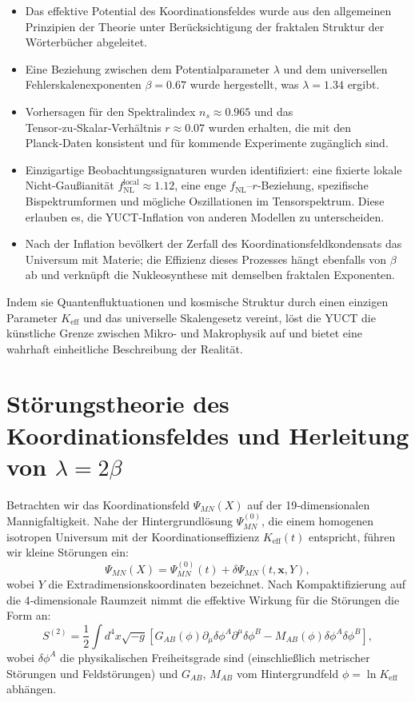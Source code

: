 \documentclass[11pt,a4paper]{article}
\newcommand{\Keff}{K_{\mathrm{eff}}}
\begin{document}
	\begin{itemize}
		\item Das effektive Potential des Koordinationsfeldes wurde aus den allgemeinen Prinzipien der Theorie unter Berücksichtigung der fraktalen Struktur der Wörterbücher abgeleitet.
		\item Eine Beziehung zwischen dem Potentialparameter \(\lambda\) und dem universellen Fehlerskalenexponenten \(\beta = 0.67\) wurde hergestellt, was \(\lambda = 1.34\) ergibt.
		\item Vorhersagen für den Spektralindex \(n_s \approx 0.965\) und das Tensor‑zu‑Skalar‑Verhältnis \(r \approx 0.07\) wurden erhalten, die mit den Planck‑Daten konsistent und für kommende Experimente zugänglich sind.
		\item Einzigartige Beobachtungssignaturen wurden identifiziert: eine fixierte lokale Nicht‑Gaußianität \(f_{\text{NL}}^{\text{local}} \approx 1.12\), eine enge \(f_{\text{NL}}\)–\(r\)‑Beziehung, spezifische Bispektrumformen und mögliche Oszillationen im Tensorspektrum. Diese erlauben es, die YUCT‑Inflation von anderen Modellen zu unterscheiden.
		\item Nach der Inflation bevölkert der Zerfall des Koordinationsfeldkondensats das Universum mit Materie; die Effizienz dieses Prozesses hängt ebenfalls von \(\beta\) ab und verknüpft die Nukleosynthese mit demselben fraktalen Exponenten.
	\end{itemize}
	
	Indem sie Quantenfluktuationen und kosmische Struktur durch einen einzigen Parameter \(K_{\mathrm{eff}}\) und das universelle Skalengesetz vereint, löst die YUCT die künstliche Grenze zwischen Mikro- und Makrophysik auf und bietet eine wahrhaft einheitliche Beschreibung der Realität.
	
	\appendix
	\section{Störungstheorie des Koordinationsfeldes und Herleitung von \(\lambda = 2\beta\)}
	\label{app:perturbations}
	
	Betrachten wir das Koordinationsfeld \(\Psi_{MN}(X)\) auf der 19‑dimensionalen Mannigfaltigkeit. Nahe der Hintergrundlösung \(\Psi^{(0)}_{MN}\), die einem homogenen isotropen Universum mit der Koordinationseffizienz \(\Keff(t)\) entspricht, führen wir kleine Störungen ein:
	\begin{equation}
		\Psi_{MN}(X) = \Psi^{(0)}_{MN}(t) + \delta\Psi_{MN}(t,\mathbf{x},Y),
	\end{equation}
	wobei \(Y\) die Extradimensionskoordinaten bezeichnet. Nach Kompaktifizierung auf die 4‑dimensionale Raumzeit nimmt die effektive Wirkung für die Störungen die Form an:
	\begin{equation}
		S^{(2)} = \frac{1}{2} \int d^4x \sqrt{-g} \left[ G_{AB}(\phi) \partial_\mu \delta\phi^A \partial^\mu \delta\phi^B - M_{AB}(\phi) \delta\phi^A \delta\phi^B \right],
	\end{equation}
	wobei \(\delta\phi^A\) die physikalischen Freiheitsgrade sind (einschließlich metrischer Störungen und Feldstörungen) und \(G_{AB}\), \(M_{AB}\) vom Hintergrundfeld \(\phi = \ln\Keff\) abhängen.
	
\end{document}
